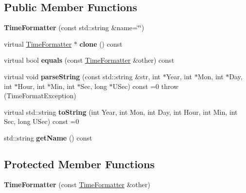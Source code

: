 \subsection*{Public Member Functions}
\begin{DoxyCompactItemize}
\item 
\hypertarget{classskl_1_1_time_formatter_a33a901eefd78aaadded7254a8005e3b8}{}\label{classskl_1_1_time_formatter_a33a901eefd78aaadded7254a8005e3b8} 
{\bfseries Time\+Formatter} (const std\+::string \&name=\char`\"{}\char`\"{})
\item 
\hypertarget{classskl_1_1_time_formatter_a10c8d84fe0fbe2abdec7962e319ffc40}{}\label{classskl_1_1_time_formatter_a10c8d84fe0fbe2abdec7962e319ffc40} 
virtual \hyperlink{classskl_1_1_time_formatter}{Time\+Formatter} $\ast$ {\bfseries clone} () const
\item 
\hypertarget{classskl_1_1_time_formatter_ac574740a7005255b669a8158729f1b80}{}\label{classskl_1_1_time_formatter_ac574740a7005255b669a8158729f1b80} 
virtual bool {\bfseries equals} (const \hyperlink{classskl_1_1_time_formatter}{Time\+Formatter} \&other) const
\item 
\hypertarget{classskl_1_1_time_formatter_aef33634872a38ff80019413edae56aeb}{}\label{classskl_1_1_time_formatter_aef33634872a38ff80019413edae56aeb} 
virtual void {\bfseries parse\+String} (const std\+::string \&str, int $\ast$Year, int $\ast$Mon, int $\ast$Day, int $\ast$Hour, int $\ast$Min, int $\ast$Sec, long $\ast$U\+Sec) const =0  throw (\+Time\+Format\+Exception)
\item 
\hypertarget{classskl_1_1_time_formatter_aa0028896c2c544917801268e97eb0a57}{}\label{classskl_1_1_time_formatter_aa0028896c2c544917801268e97eb0a57} 
virtual std\+::string {\bfseries to\+String} (int Year, int Mon, int Day, int Hour, int Min, int Sec, long U\+Sec) const =0
\item 
\hypertarget{classskl_1_1_time_formatter_af4f4ed9eef376bd3d920b56822873c0c}{}\label{classskl_1_1_time_formatter_af4f4ed9eef376bd3d920b56822873c0c} 
std\+::string {\bfseries get\+Name} () const
\end{DoxyCompactItemize}
\subsection*{Protected Member Functions}
\begin{DoxyCompactItemize}
\item 
\hypertarget{classskl_1_1_time_formatter_abe8fae39578eb6b94b4a669d679a7bf1}{}\label{classskl_1_1_time_formatter_abe8fae39578eb6b94b4a669d679a7bf1} 
{\bfseries Time\+Formatter} (const \hyperlink{classskl_1_1_time_formatter}{Time\+Formatter} \&other)
\end{DoxyCompactItemize}
